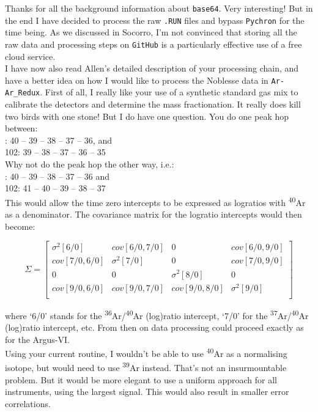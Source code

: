 \documentclass{article}
\begin{document}
Thanks for all the background information about \texttt{base64}. Very
interesting! But in the end I have decided to process the raw
\texttt{.RUN} files and bypass \texttt{Pychron} for the time being. As
we discussed in Socorro, I'm not convinced that storing all the raw
data and processing steps on \texttt{GitHub} is a particularly
effective use of a free cloud service.\\

I have now also read Allen's detailed description of your processing
chain, and have a better idea on how I would like to process the
Noblesse data in \texttt{Ar-Ar\_Redux}.  First of all, I really like
your use of a synthetic standard gas mix to calibrate the detectors
and determine the mass fractionation.  It really does kill two birds
with one stone! But I do have one question. You do one peak hop
between:\\

: 40 -- 39 -- 38 -- 37 -- 36, and\\
102: 39 -- 38 -- 37 -- 36 -- 35\\

Why not do the peak hop the other way, i.e.:\\

: 40 -- 39 -- 38 -- 37 -- 36 and\\
102: 41 -- 40 -- 39 -- 38 -- 37\\

This would allow the time zero intercepts to be expressed as logratios
with \textsuperscript{40}Ar as a denominator. The covariance matrix
for the logratio intercepts would then become:

  \[
  \Sigma = \left[
    \begin{array}{cccc}
      \sigma^2[6/0] & cov[6/0,7/0] & 0 & cov[6/0,9/0] \\
      cov[7/0,6/0] & \sigma^2[7/0] & 0 & cov[7/0,9/0] \\
      0 & 0 & \sigma^2[8/0] & 0 \\
      cov[9/0,6/0] & cov[9/0,7/0] & cov[9/0,8/0] & \sigma^2[9/0] \\
    \end{array}
    \right]
  \]

  where `6/0' stands for the
  \textsuperscript{36}Ar/\textsuperscript{40}Ar (log)ratio intercept,
  `7/0' for the \textsuperscript{37}Ar/\textsuperscript{40}Ar
  (log)ratio intercept, etc. From then on data processing could
  proceed exactly as for the Argus-VI.\\

  Using your current routine, I wouldn't be able to use
  \textsuperscript{40}Ar as a normalising isotope, but would need to
  use \textsuperscript{39}Ar instead. That's not an insurmountable
  problem. But it would be more elegant to use a uniform approach for
  all instruments, using the largest signal. This would also result in
  smaller error correlations.
\end{document}
